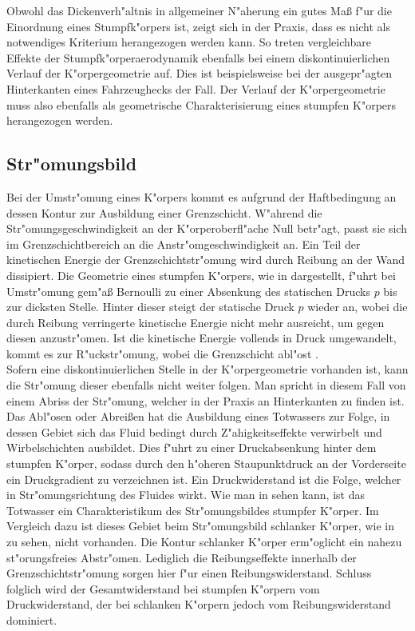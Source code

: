 Obwohl das Dickenverh"altnis in allgemeiner N"aherung ein gutes Ma\ss{} f"ur die Einordnung eines Stumpfk"orpers ist, zeigt sich in der Praxis, dass es nicht als notwendiges Kriterium herangezogen werden kann. So treten vergleichbare Effekte der Stumpfk"orperaerodynamik ebenfalls bei einem diskontinuierlichen Verlauf der K"orpergeometrie auf. Dies ist beispielsweise bei der ausgepr"agten Hinterkanten eines Fahrzeughecks der Fall. Der Verlauf der K"orpergeometrie muss also ebenfalls als geometrische Charakterisierung eines stumpfen K"orpers herangezogen werden.


\subsection{Str"omungsbild}
\label{sec:Stromungsbild}
Bei der Umstr"omung eines K"orpers kommt es aufgrund der Haftbedingung an dessen Kontur zur Ausbildung einer Grenzschicht. W"ahrend die Str"omungsgeschwindigkeit an der K"orperoberfl"ache Null betr"agt, passt sie sich im Grenzschichtbereich an die Anstr"omgeschwindigkeit an. Ein Teil der kinetischen Energie der Grenzschichtstr"omung wird durch Reibung an der Wand dissipiert.
Die Geometrie eines stumpfen K"orpers, wie in  dargestellt, f"uhrt bei Umstr"omung gem"a\ss{} Bernoulli zu einer Absenkung des statischen Drucks $p$ bis zur dicksten Stelle. Hinter dieser steigt der statische Druck $p$ wieder an, wobei die durch Reibung verringerte kinetische Energie nicht mehr ausreicht, um gegen diesen anzustr"omen. Ist die kinetische Energie vollends in Druck umgewandelt, kommt es zur R"uckstr"omung, wobei die Grenzschicht abl"ost \cite{Hucho.2011}.\\
Sofern eine diskontinuierlichen Stelle in der K"orpergeometrie vorhanden ist, kann die Str"omung dieser ebenfalls nicht weiter folgen. Man spricht in diesem Fall von einem Abriss der Str"omung, welcher in der Praxis an Hinterkanten zu finden ist.\\
Das Abl"osen oder Abrei\ss{}en hat die Ausbildung eines Totwassers zur Folge, in dessen Gebiet sich das Fluid bedingt durch Z"ahigkeitseffekte verwirbelt und Wirbelschichten ausbildet. Dies f"uhrt zu einer Druckabsenkung hinter dem stumpfen K"orper, sodass durch den h"oheren Staupunktdruck an der Vorderseite ein Druckgradient zu verzeichnen ist. Ein Druckwiderstand ist die Folge, welcher in Str"omungsrichtung des Fluides wirkt. Wie man in  sehen kann, ist das Totwasser ein Charakteristikum des Str"omungsbildes stumpfer K"orper. Im Vergleich dazu ist dieses Gebiet beim Str"omungsbild schlanker K"orper, wie in  zu sehen, nicht vorhanden. Die Kontur schlanker K"orper erm"oglicht ein nahezu st"orungsfreies Abstr"omen. Lediglich die Reibungseffekte innerhalb der Grenzschichtstr"omung sorgen hier f"ur einen Reibungswiderstand. Schluss folglich wird der Gesamtwiderstand bei stumpfen K"orpern vom Druckwiderstand, der bei schlanken K"orpern jedoch vom Reibungswiderstand dominiert.


